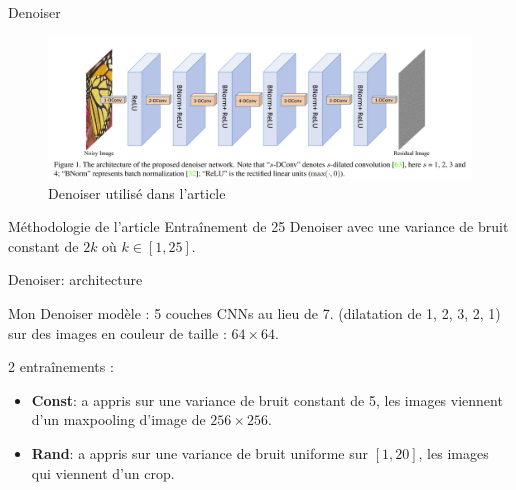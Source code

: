 \documentclass[11pt]{beamer}
\begin{document}
\begin{frame}{Denoiser}
    \begin{figure}
        \centering
        \includegraphics[width=\textwidth]{../paper/model.png}
        \caption{Denoiser utilisé dans l'article}
    \end{figure}
    \begin{block}{Méthodologie de l'article}
        Entraînement de 25 Denoiser avec une variance de bruit constant de $2k$ où $k\in [1, 25]$.
    \end{block}
\end{frame}

\begin{frame}{Denoiser: architecture}
    \begin{block}{Mon Denoiser}
        modèle : 5 couches CNNs au lieu de 7. (dilatation de 1, 2, 3, 2, 1) sur des images en 
        couleur de taille : $64 \times 64$.

        2 entraînements : 
        \begin{itemize}
            \item \textbf{Const}: a appris sur une variance de bruit constant de 5,
            les images viennent d'un maxpooling d'image de $256 \times 256$. \\

            \item \textbf{Rand}: a appris sur une variance de bruit uniforme sur $[1, 20]$, 
            les images qui viennent d'un crop.
        \end{itemize}
    \end{block}
\end{frame}
\end{document}
